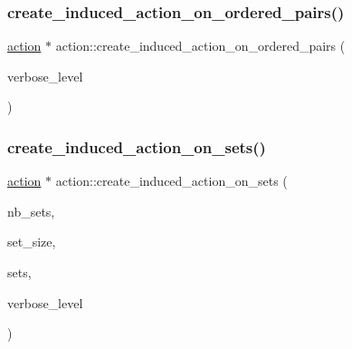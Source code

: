 \subsubsection{\texorpdfstring{create\+\_\+induced\+\_\+action\+\_\+on\+\_\+ordered\+\_\+pairs()}{create\_induced\_action\_on\_ordered\_pairs()}}
{\footnotesize\ttfamily \mbox{\hyperlink{classaction}{action}} $\ast$ action\+::create\+\_\+induced\+\_\+action\+\_\+on\+\_\+ordered\+\_\+pairs (\begin{DoxyParamCaption}\item[{\mbox{\hyperlink{galois_8h_a09fddde158a3a20bd2dcadb609de11dc}{I\+NT}}}]{verbose\+\_\+level }\end{DoxyParamCaption})}

\mbox{\label{classaction_ac463caa613a28f37e7c3ea63b2d5b0ed}} 
\subsubsection{\texorpdfstring{create\+\_\+induced\+\_\+action\+\_\+on\+\_\+sets()}{create\_induced\_action\_on\_sets()}}
{\footnotesize\ttfamily \mbox{\hyperlink{classaction}{action}} $\ast$ action\+::create\+\_\+induced\+\_\+action\+\_\+on\+\_\+sets (\begin{DoxyParamCaption}\item[{\mbox{\hyperlink{galois_8h_a09fddde158a3a20bd2dcadb609de11dc}{I\+NT}}}]{nb\+\_\+sets,  }\item[{\mbox{\hyperlink{galois_8h_a09fddde158a3a20bd2dcadb609de11dc}{I\+NT}}}]{set\+\_\+size,  }\item[{\mbox{\hyperlink{galois_8h_a09fddde158a3a20bd2dcadb609de11dc}{I\+NT}} $\ast$}]{sets,  }\item[{\mbox{\hyperlink{galois_8h_a09fddde158a3a20bd2dcadb609de11dc}{I\+NT}}}]{verbose\+\_\+level }\end{DoxyParamCaption})}

\mbox{\label{classaction_aa3f0c4992762ff3fda44ba5fdff3e8dd}} 

